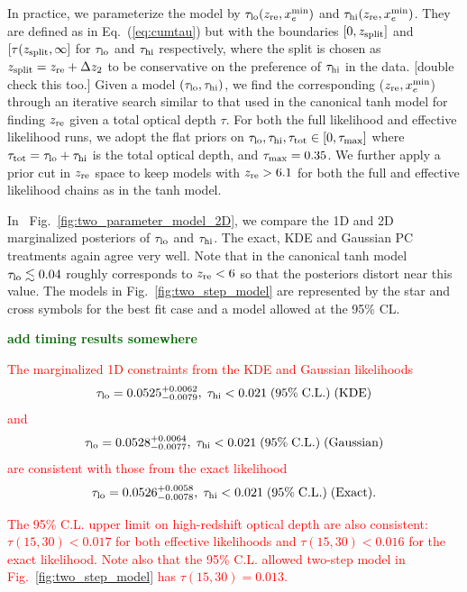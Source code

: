 \documentclass[prd,twocolumn,amsmath,amssymb,floatfix,superscriptaddress,nofootinbib]{revtex4-1}
\newcommand{\refeq}[1]{Eq.~(\ref{eq:#1})}
\newcommand{\reffig}[1]{Fig.~\ref{fig:#1}}
\newcommand{\zre}{z_{\rm re}}
\newcommand{\xemin}{x_e^{\rm min}}
\newcommand{\tauhi}{\tau_{\rm hi}}
\newcommand{\taulo}{\tau_{\rm lo}}
\newcommand{\beq}{\begin{equation}}
\newcommand{\eeq}{\end{equation}}
\newcommand{\ch}[1]{\textcolor{red}{#1}}
\newcommand{\todo}[1]{\textcolor{darkgreen}{\bf{#1}}}
\begin{document}
In practice, we parameterize the model by $\taulo(\zre, \xemin)$ and $\tauhi(\zre, \xemin)$.  They are defined as in \refeq{cumtau} but with the boundaries $[0, z_{\rm split}]$ and $[\tau(z_{\rm split}, \infty]$ for $\taulo$ and $\tauhi$ respectively, where the split is chosen as $z_{\rm split} = \zre + \Delta z_2$ to be conservative on the preference of $\tauhi$ in the data. [double check this too.]
Given a model $(\taulo, \tauhi)$, we find the corresponding ($\zre, \xemin$) through an iterative search similar to that used in the canonical tanh model for finding $\zre$ given a total optical depth $\tau$. 
For both the full likelihood and effective likelihood runs, we adopt the flat priors on $\taulo, \tauhi, \tau_{\rm tot} \in [0, \tau_{\rm max}]$ where  $\tau_{\rm tot} = \taulo + \tauhi$ is the total optical depth, and $\tau_{\rm max} = 0.35$. 
We further apply a prior cut in $\zre$ space to keep models with $\zre > 6.1$ for both the full and effective likelihood chains as in the tanh model. 

In ~\reffig{two_parameter_model_2D}, we compare the 1D and 2D marginalized posteriors of $\taulo$ and $\tauhi$. The exact, KDE and Gaussian PC treatments again agree very well. 
Note that in the canonical tanh model $\taulo \lesssim 0.04$ roughly corresponds to $\zre < 6$ so that the posteriors distort near this value.
The models in Fig.~\ref{fig:two_step_model} are represented by the star and cross symbols for the best fit case and a model allowed at the 95\% CL.

\todo{add timing results somewhere}

\ch{The marginalized 1D constraints from the KDE and Gaussian likelihoods 
\beq
\taulo = 0.0525^{+0.0062}_{-0.0079}, \; \tauhi < 0.021\; \mathrm{(95\%\; C.L.)\; (KDE)}
\eeq 
and
\beq
\taulo = 0.0528^{+0.0064}_{- 0.0077}, \; \tauhi < 0.021\; \mathrm{(95\%\; C.L.)\; (Gaussian)}
\eeq 
are consistent with those from the exact likelihood 
\beq
\taulo = 0.0526^{+0.0058}_{-0.0078}, \; \tauhi < 0.021\; \mathrm{(95\%\; C.L.)\; (Exact).}
\eeq 
}


\ch{The 95\% C.L. upper limit on high-redshift optical depth are also consistent: $\tau(15, 30) < 0.017$ for both effective likelihoods and $\tau(15, 30) < 0.016$ for the exact likelihood.}
\ch{Note also that the 95\% C.L. allowed two-step model in 
Fig.~\ref{fig:two_step_model} has
$\tau(15,30)= 0.013$.}
\end{document}
